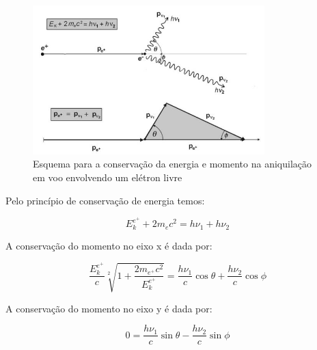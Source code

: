 \documentclass[11pt,a4paper]{article}
\begin{document}
\begin{enumerate}
\begin{enumerate}
                        \begin{figure}[h]
                            \centering
                            \includegraphics[width=0.8\textwidth]{Imagens/esquemaAniquilacaoVoo.JPG}
                            \caption{Esquema para a conservação da energia e momento na aniquilação em voo envolvendo um elétron livre}
                            \label{fig:aniquilacaoVooEletronLivre}
                        \end{figure}

                        Pelo princípio de conservação de energia temos:

                            \begin{equation*}
                                E_k^{e^+} + 2m_ec^2 = h\nu_1 + h\nu_2
                            \end{equation*}

                        A conservação do momento no eixo x é dada por:

                            \begin{equation*}
                                \frac{E_k^{e^+}}{c}\sqrt[2]{1 + \frac{2m_{e^+}c^2}{E_k^{e^+}}} = \frac{h\nu_1}{c}\cos \theta + \frac{h\nu_2}{c}\cos \phi
                            \end{equation*}

                        A conservação do momento no eixo y é dada por:

                            \begin{equation*}
                                0 = \frac{h\nu_1}{c}\sin \theta - \frac{h\nu_2}{c}\sin \phi
                            \end{equation*}

                        \end{enumerate}
                    
            \end{enumerate}
\end{document}
